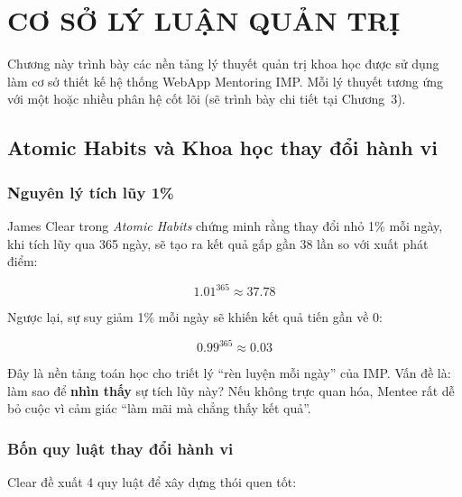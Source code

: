 \chapter{CƠ SỞ LÝ LUẬN QUẢN TRỊ}

Chương này trình bày các nền tảng lý thuyết quản trị khoa học được sử dụng làm cơ sở thiết kế hệ thống WebApp Mentoring IMP. Mỗi lý thuyết tương ứng với một hoặc nhiều phân hệ cốt lõi (sẽ trình bày chi tiết tại Chương~3).

\section{Atomic Habits và Khoa học thay đổi hành vi}

\subsection{Nguyên lý tích lũy 1\%}
James Clear trong \textit{Atomic Habits} \citep{atomichabits2018} chứng minh rằng thay đổi nhỏ 1\% mỗi ngày, khi tích lũy qua 365 ngày, sẽ tạo ra kết quả gấp gần 38 lần so với xuất phát điểm:

\begin{equation}
  1.01^{365} \approx 37.78
\end{equation}

Ngược lại, sự suy giảm 1\% mỗi ngày sẽ khiến kết quả tiến gần về 0:

\begin{equation}
  0.99^{365} \approx 0.03
\end{equation}

Đây là nền tảng toán học cho triết lý ``rèn luyện mỗi ngày'' của IMP. Vấn đề là: làm sao để \textbf{nhìn thấy} sự tích lũy này? Nếu không trực quan hóa, Mentee rất dễ bỏ cuộc vì cảm giác ``làm mãi mà chẳng thấy kết quả''.

\subsection{Bốn quy luật thay đổi hành vi}
Clear đề xuất 4 quy luật để xây dựng thói quen tốt:

